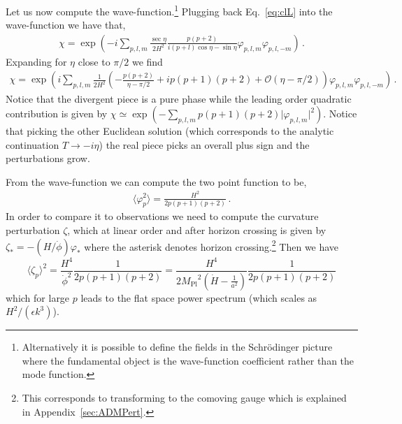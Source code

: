 \documentclass[a4paper,11pt]{article}
\numberwithin{equation}{section}
\newcommand{\be}{\begin{equation}}
\newcommand{\ee}{\end{equation}}
\newcommand{\mpl}{{M_{\mathrm{Pl}}}}
\numberwithin{equation}{section}
\begin{document}
Let us now compute  the wave-function.\footnote{Alternatively it is possible to define the fields in the Schr\"odinger picture~\cite{Luscher:1985iu,Long:1996wf} where the fundamental object is the wave-function coefficient rather than the mode function.} Plugging back Eq.~\eqref{eq:clL} into the wave-function we have that,
 \begin{align}
 \label{eq:WaveFunction1}
 \chi=\exp\left(-i\sum_{p, l, m}   \frac{\sec \eta}{2H^2} \frac{p (p+2)}{i(p+l)\cos \eta-\sin \eta}\varphi_{p,l, m}\varphi_{p, l, -m}\right)\,.
 \end{align}
Expanding for $\eta$ close to $\pi/2$ we find
 \begin{align}
 \chi=\exp\left(i\sum_{p,l,m}\frac{1}{2H^2}\left(-\frac{p(p+2)}{\eta-\pi/2}+i p(p+1)(p+2)+\mathcal O(\eta-\pi/2)\right)\varphi_{p, l, m}\varphi_{p, l, -m}\right) \,.
 \label{eq:wavefunction_latetime}
 \end{align}
Notice that the divergent piece is a pure phase while the leading order quadratic contribution is given by $\chi \simeq \exp(-\sum_{p,l,m}p(p+1)(p+2)\vert\varphi_{p, l, m}\vert^2)$. Notice that picking the other Euclidean solution (which corresponds to the analytic continuation $T\to-i\eta$) the real piece picks an overall plus sign and the perturbations grow. 

From the wave-function we can compute the two point function to be,
 \begin{align}
 \langle\varphi_p^2\rangle= \frac{H^2}{2p(p+1)(p+2)} \,.
 \label{eq:2point_function}
 \end{align}
 In order to compare it to observations we need to compute the curvature perturbation $\zeta$, which at linear order  and after horizon crossing is given by $\zeta_*=-(H/\dot\phi) \varphi_*$ where the asterisk denotes horizon crossing.\footnote{This corresponds to transforming to the  comoving gauge which is  explained in Appendix~\ref{sec:ADMPert}.} Then we have
 \be
\boxed{ \langle \zeta_p\rangle^2=\frac{H^4}{\dot\phi^2}\frac{1}{2p(p+1)(p+2)}=\frac{H^4}{2\mpl^2 (\dot H-\frac{1}{a^2})}\frac{1}{2p(p+1)(p+2)}}
 \label{eq:2point_function2}
\ee
which for large $p$ leads to the flat space power spectrum (which scales as $H^2/(\epsilon  k^{3})$).
\end{document}
